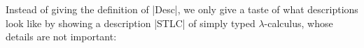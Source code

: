 \documentclass[sigplan,review,fleqn]{acmart}
\renewcommand{\verb}{\collectverb{\color{AgdaFunction}}}
\newcommand{\con}{\collectverb{\color{AgdaInductiveConstructor}}}
\begin{document}
Instead of giving the definition of \verb|Desc|, we only give a taste of what descriptions look like by showing a description \verb|STLC| of simply typed $\lambda$-calculus, whose details are not important:%
\end{document}
